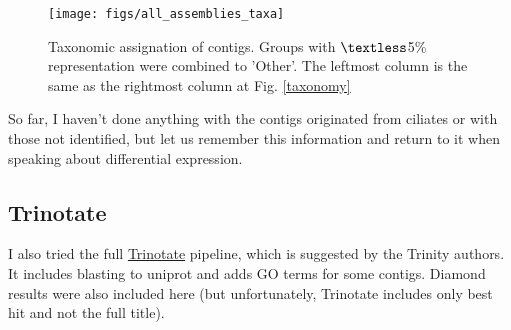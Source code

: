 \documentclass[12pt]{article}
\begin{document}
\begin{figure}[H]
\texttt{[image: figs/all\_assemblies\_taxa]}
\caption{Taxonomic assignation of contigs. Groups with $\textless$5\% representation were combined to 'Other'. The leftmost column is the same as the rightmost column at Fig. \ref{taxonomy}}
\label{all_assemblies_taxa}
\end{figure}

So far, I haven't done anything with the contigs originated from ciliates or with those not identified, but let us remember this information and return to it when speaking about differential expression. 

\subsection{Trinotate}

I also tried the full \href{https://trinotate.github.io/}{Trinotate} pipeline, which is suggested by the Trinity authors. It includes blasting to uniprot and adds GO terms for some contigs. Diamond results were also included here (but unfortunately, Trinotate includes only best hit and not the full title). 
\end{document}
